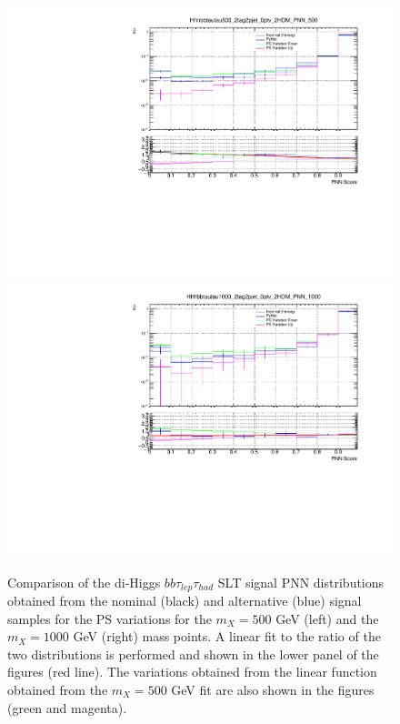 \begin{figure}
\centering
\includegraphics[width=.49\textwidth]{figures/systs/LepHad_Signal_SLT_500_psSysts_PNN_Fit_Logy.pdf}
\includegraphics[width=.49\textwidth]{figures/systs/LepHad_Signal_SLT_1000_psSysts_PNN_Fit_Logy.pdf}
\caption{Comparison of the di-Higgs $bb\tau_{lep}\tau_{had}$ SLT signal PNN distributions obtained from the nominal (black) and alternative (blue) signal samples for the PS variations for the  $m_X= 500$ GeV (left) and the $m_X=1000$ GeV (right) mass points. A linear fit to the ratio of the two distributions is performed and shown in the lower panel of the figures (red line). The variations obtained from the linear function obtained from the $m_X= 500$ GeV fit are also shown in the figures (green and magenta).}
\label{fig:LepHadSLTSignalSysts}
\end{figure}

